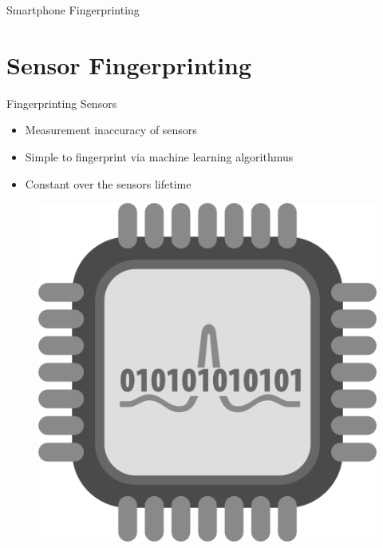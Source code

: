 \documentclass[aspectratio=169]{beamer}
[aspectratio=169] %
\begin{document}
\begin{frame}{Smartphone Fingerprinting}
\begin{minipage}{0.49\textwidth}
\begin{figure}
    \end{figure}
  \end{minipage}
\end{frame}


\section{Sensor Fingerprinting}

\begin{frame}{Fingerprinting Sensors}
  \begin{minipage}{0.49\textwidth} 
    \begin{itemize}
      \item Measurement inaccuracy of sensors
      \pause
      \item Simple to fingerprint via machine learning algorithmus
      \pause
      \item Constant over the sensors lifetime
    \end{itemize}
  \end{minipage}
  \hfill
  \begin{minipage}{0.49\textwidth}
    \begin{figure}
      \centering
      \includegraphics[height=0.5\textheight]{figures/analog.png}
    \end{figure}
  \end{minipage}
\end{frame}
\end{document}
